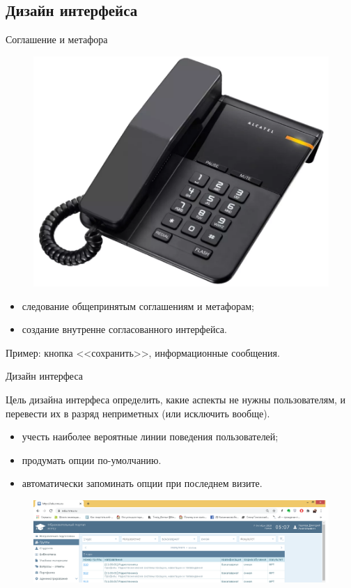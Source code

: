 \documentclass{beamer}
\begin{document}
\subsection{Дизайн интерфейса}

\begin{frame}[t]{Соглашение и метафора}
\begin{figure}[h]
\centering
\includegraphics[scale=0.25]{images/lec04-pic03.png}
\end{figure}
\begin{itemize}
\item следование общепринятым соглашениям и метафорам;
\item создание внутренне согласованного интерфейса.
\end{itemize}
Пример: кнопка <<сохранить>>, информационные сообщения.
\end{frame} 

\begin{frame}[t]{Дизайн интерфеса}
\begin{block}{Цель дизайна интерфеса}
определить, какие аспекты не нужны пользователям, и перевести их в разряд неприметных (или исключить вообще).
\end{block}
\begin{itemize}
\item учесть наиболее вероятные линии поведения пользователей;
\item продумать опции по-умолчанию.
\item автоматически запоминать опции при последнем визите.
\end{itemize}
\begin{figure}[h]
\centering
\includegraphics[scale=0.25]{images/lec04-pic04.png}
\end{figure}
\end{frame} 
\end{document}
